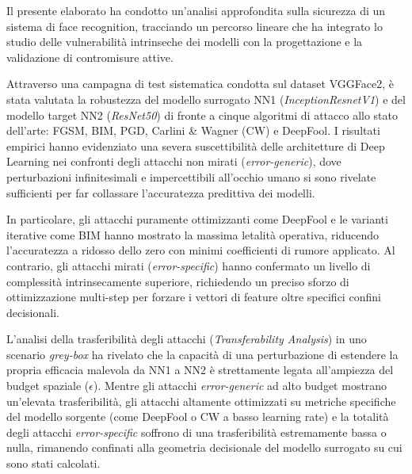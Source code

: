 \documentclass[a4paper, 12pt]{article}
\begin{document}
Il presente elaborato ha condotto un'analisi approfondita sulla sicurezza di un sistema di face recognition, 
tracciando un percorso lineare che ha integrato lo studio delle vulnerabilità intrinseche dei modelli con la progettazione e 
la validazione di contromisure attive.

Attraverso una campagna di test sistematica condotta sul dataset VGGFace2, è stata valutata la robustezza del modello surrogato 
NN1 (\textit{InceptionResnetV1}) e del modello target NN2 (\textit{ResNet50}) di fronte a cinque algoritmi di attacco allo stato 
dell'arte: FGSM, BIM, PGD, Carlini \& Wagner (CW) e DeepFool. I risultati empirici hanno evidenziato una severa suscettibilità delle 
architetture di Deep Learning nei confronti degli attacchi non mirati (\textit{error-generic}), dove perturbazioni infinitesimali
e impercettibili all'occhio umano si sono rivelate sufficienti per far collassare l'accuratezza predittiva dei modelli. 

In particolare, gli attacchi puramente ottimizzanti come DeepFool e le varianti iterative come BIM hanno mostrato la massima letalità operativa, 
riducendo l'accuratezza a ridosso dello zero con minimi coefficienti di rumore applicato. Al contrario, gli attacchi mirati (\textit{error-specific}) 
hanno confermato un livello di complessità intrinsecamente superiore, richiedendo un preciso sforzo di ottimizzazione multi-step per forzare 
i vettori di feature oltre specifici confini decisionali.

L'analisi della trasferibilità degli attacchi (\textit{Transferability Analysis}) in uno scenario \textit{grey-box} ha rivelato 
che la capacità di una perturbazione di estendere la propria efficacia malevola da NN1 a NN2 è strettamente legata all'ampiezza del 
budget spaziale ($\epsilon$). Mentre gli attacchi \textit{error-generic} ad alto budget mostrano un'elevata trasferibilità, gli attacchi 
altamente ottimizzati su metriche specifiche del modello sorgente (come DeepFool o CW a basso learning rate) e la totalità degli attacchi 
\textit{error-specific} soffrono di una trasferibilità estremamente bassa o nulla, rimanendo confinati alla geometria decisionale del 
modello surrogato su cui sono stati calcolati.
\end{document}

